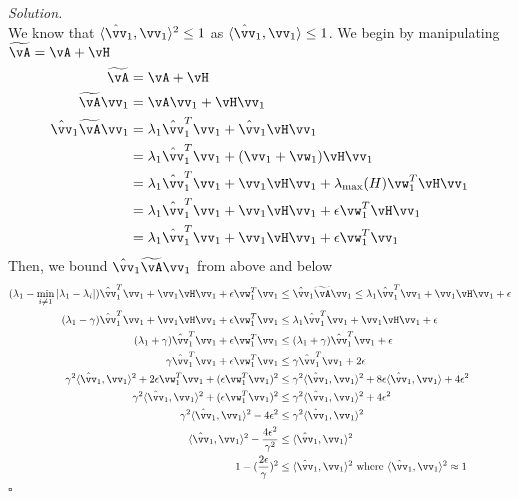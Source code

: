 \documentclass[11pt]{article}
\newcommand\ip[1]{\langle #1 \rangle} %
\theoremstyle{definition}
\newenvironment{solution}{\noindent\emph{Solution.}}{\hfill$\square$}
\begin{document}
\begin{solution}
\\
We know that $\ip{\hat\vv_1,\vv_1}^2 \leq 1$ as $\ip{\hat\vv_1,\vv_1} \leq 1$. We begin by manipulating $\widetilde{\vA} = \vA + \vH$
\begin{align*}
\widetilde{\vA} &= \vA + \vH \\
\widetilde{\vA}\vv_1 &= \vA\vv_1 + \vH\vv_1\\
\hat{\vv}_1 \widetilde{\vA}\vv_1 
&= \lambda_1 \hat{\vv}_1^T \vv_1 + \hat{\vv}_1 \vH\vv_1\\
&= \lambda_1 \hat{\vv}_1^T \vv_1 + (\vv_1 + \vw_1)\vH\vv_1\\
&= \lambda_1 \hat{\vv}_1^T \vv_1 + \vv_1\vH\vv_1 + \lambda_{\max}(H)\vw_1^T\vH\vv_1\\
&= \lambda_1 \hat{\vv}_1^T \vv_1 + \vv_1\vH\vv_1 + \epsilon \vw_1^T\vH\vv_1\\
&= \lambda_1 \hat{\vv}_1^T \vv_1 + \vv_1\vH\vv_1 + \epsilon \vw_1^T\vv_1\\
\end{align*}
Then, we bound $\hat{\vv}_1 \widetilde{\vA}\vv_1$ from above and below
\begin{align*}
(\lambda_1 - \min_{i \neq 1}|\lambda_1 - \lambda_i|)\hat{\vv}_1^T \vv_1 + \vv_1\vH\vv_1 + \epsilon \vw_1^T\vv_1 
&\leq \hat{\vv}_1 \widetilde{\vA}\vv_1 
\leq \lambda_1 \hat{\vv}_1^T \vv_1 + \vv_1\vH\vv_1 + \epsilon\\
(\lambda_1 - \gamma)\hat{\vv}_1^T \vv_1 + \vv_1\vH\vv_1 + \epsilon \vw_1^T\vv_1 &\leq \lambda_1 \hat{\vv}_1^T \vv_1 + \vv_1\vH\vv_1 + \epsilon\\
(\lambda_1 + \gamma)\hat{\vv}_1^T \vv_1 +  \epsilon \vw_1^T\vv_1 &\leq (\lambda_1 + \gamma) \hat{\vv}_1^T \vv_1 + \epsilon\\
\gamma \hat{\vv}_1^T \vv_1 +  \epsilon \vw_1^T\vv_1 &\leq \gamma \hat{\vv}_1^T \vv_1 + 2\epsilon\\
\gamma^2 \ip{\hat\vv_1,\vv_1}^2 + 2  \epsilon \vw_1^T\vv_1 +  (\epsilon \vw_1^T\vv_1)^2 &\leq \gamma^2 \ip{\hat\vv_1,\vv_1}^2 + 8\epsilon \ip{\hat\vv_1,\vv_1} + 4\epsilon^2\\
\gamma^2 \ip{\hat\vv_1,\vv_1}^2 +  (\epsilon \vw_1^T\vv_1)^2 &\leq \gamma^2 \ip{\hat\vv_1,\vv_1}^2 + 4\epsilon^2\\
\gamma^2 \ip{\hat\vv_1,\vv_1}^2 - 4\epsilon^2 &\leq \gamma^2 \ip{\hat\vv_1,\vv_1}^2\\
\ip{\hat\vv_1,\vv_1}^2 - \frac{4\epsilon^2}{\gamma^2 } &\leq \ip{\hat\vv_1,\vv_1}^2\\
1 - (\frac{2\epsilon}{\gamma})^2 &\leq \ip{\hat\vv_1,\vv_1}^2 \textrm{ where } \ip{\hat\vv_1,\vv_1}^2 \approx 1\\
\end{align*}
\end{solution}
\end{document}
